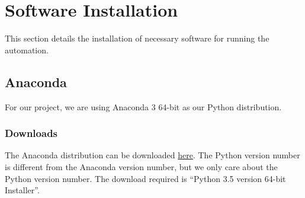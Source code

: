 \documentclass[11pt, letterpaper, titlepage]{article}
\begin{document}
\section{Software Installation} \label{softwareinstallation} %
This section details the installation of necessary software for running the automation.
\subsection{Anaconda} \label{anaconda} %
For our project, we are using Anaconda 3 64-bit as our Python distribution.
\subsubsection{Downloads} %
The Anaconda distribution can be downloaded \href{https://www.continuum.io/downloads}{here}.
The Python version number is different from the Anaconda version number, but we only care about the Python version number.
The download required is ``Python 3.5 version 64-bit Installer''.
\end{document}
